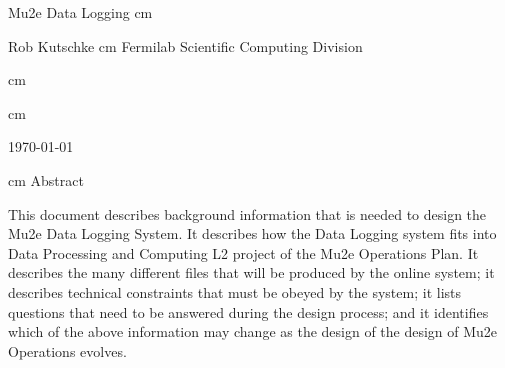 %
\begin{center}
  {\Huge Mu2e Data Logging}
   cm

  Rob Kutschke
 cm
Fermilab Scientific Computing Division

 cm


%

%

 cm

\today

 cm
Abstract
\end{center}
\medskip

This document describes background information
that is needed to design the Mu2e Data Logging System.
It describes how the Data Logging system fits into
Data Processing and Computing L2 project of the Mu2e Operations Plan.
It describes the many different files that will be produced by the online system;
it describes technical constraints that must be obeyed by the system;
it lists questions that need to be answered during the design process;
and it identifies which of the above information may change as the
design of the design of Mu2e Operations evolves.
\cleardoublepage
